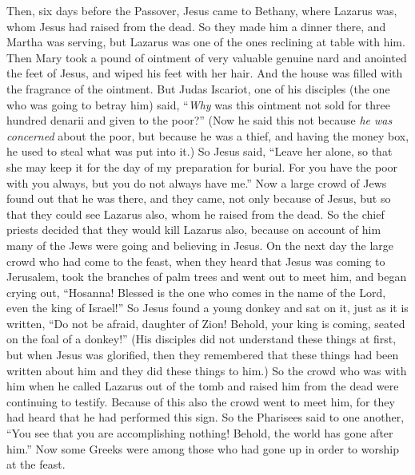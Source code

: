 \begin{biblechapter} %
 Then, six days before the Passover, Jesus came to Bethany, where Lazarus was, whom Jesus had raised from the dead.
\verse So they made him a dinner there, and Martha was serving, but Lazarus was one of the ones reclining at table with him.
\verse Then Mary took a pound of ointment of very valuable genuine nard and anointed the feet of Jesus, and wiped his feet with her hair. And the house was filled with the fragrance of the ointment.
\verse But Judas Iscariot, one of his disciples (the one who was going to betray him) said,
\verse “\textit{Why} was this ointment not sold for three hundred denarii and given to the poor?”
\verse (Now he said this not because \textit{he was concerned} about the poor, but because he was a thief, and having the money box, he used to steal what was put into it.)
\verse So Jesus said, “Leave her alone, so that she may keep it for the day of my preparation for burial.
\verse For you have the poor with you always, but you do not always have me.”
 Now a large crowd of Jews found out that he was there, and they came, not only because of Jesus, but so that they could see Lazarus also, whom he raised from the dead.
\verse So the chief priests decided that they would kill Lazarus also,
\verse because on account of him many of the Jews were going and believing in Jesus.
 On the next day the large crowd who had come to the feast, when they heard that Jesus was coming to Jerusalem,
\verse took the branches of palm trees and went out to meet him, and began crying out, “Hosanna! 
Blessed is the one who comes in the name of the Lord, 
even the king of Israel!”
\verse So Jesus found a young donkey and sat on it, just as it is written,
\verse “Do not be afraid, daughter of Zion! 
Behold, your king is coming, 
seated on the foal of a donkey!”
\verse (His disciples did not understand these things at first, but when Jesus was glorified, then they remembered that these things had been written about him and they did these things to him.)
\verse So the crowd who was with him when he called Lazarus out of the tomb and raised him from the dead were continuing to testify.
\verse Because of this also the crowd went to meet him, for they had heard that he had performed this sign.
\verse So the Pharisees said to one another, “You see that you are accomplishing nothing! Behold, the world has gone after him.”
 Now some Greeks were among those who had gone up in order to worship at the feast.

\end{biblechapter}
